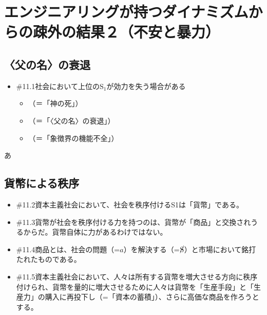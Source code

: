 \section{エンジニアリングが持つダイナミズムからの疎外の結果２（不安と暴力）}\label{ux30a8ux30f3ux30b8ux30cbux30a2ux30eaux30f3ux30b0ux304cux6301ux3064ux30c0ux30a4ux30caux30dfux30baux30e0ux304bux3089ux306eux758eux5916ux306eux7d50ux679cuxff12ux4e0dux5b89ux3068ux66b4ux529b}

\subsection{〈父の名〉の衰退}\label{ux7236ux306eux540dux306eux8870ux9000}

\begin{note}{}
  \begin{itemize}
    \tightlist
    \item{\#11.1}社会において上位の$\textrm{S}_1$が効力を失う場合がある
      \begin{itemize}
        \tightlist
        \item （＝「神の死」）
        \item （＝「〈父の名〉の衰退」）
        \item （＝「象徴界の機能不全」）
      \end{itemize}
  \end{itemize}
\end{note}

あ

\subsection{貨幣による秩序}\label{ux8ca8ux5e63ux306bux3088ux308bux79e9ux5e8f}

\begin{note}{}
  \begin{itemize}
    \tightlist
    \item{\#11.2}資本主義社会において、社会を秩序付けるS1は「貨幣」である。
    \item{\#11.3}貨幣が社会を秩序付ける力を持つのは、貨幣が「商品」と交換されうるからだ。貨幣自体に力があるわけではない。
    \item{\#11.4}商品とは、社会の問題（=$a$）を解決する（=$\cancel{\textrm{S}}$）と市場において銘打たれたものである。
    \item{\#11.5}資本主義社会において、人々は所有する貨幣を増大させる方向に秩序付けられ、貨幣を量的に増大させるために人々は貨幣を「生産手段」と「生産力」の購入に再投下し（=「資本の蓄積」）、さらに高価な商品を作ろうとする。
  \end{itemize}
\end{note}

